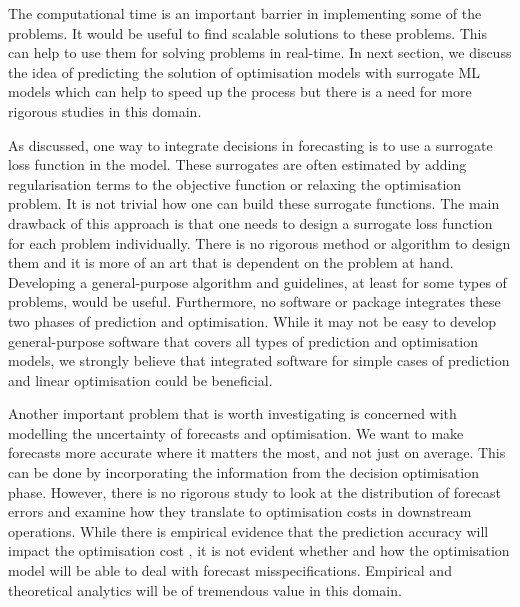 \documentclass[graybox]{svmult}
\begin{document}
 The computational time is an important barrier in implementing some of the problems. It would be useful to find scalable solutions to these problems. This can help to use them for solving problems in real-time.  In next section, we discuss the idea of predicting the solution of optimisation models with surrogate ML models which can help to speed up the process but there is a need for more rigorous studies in this domain. 

As discussed, one way to integrate decisions in forecasting is to use a  surrogate loss function in the model. These surrogates are often estimated by adding regularisation terms to the objective function or relaxing the optimisation problem. It is not trivial how one can build these surrogate functions. The main drawback of this approach is that one needs to design a surrogate loss function for each problem individually. There is no rigorous method or algorithm to design them and it is more of an art that is dependent on the problem at hand. Developing a general-purpose algorithm and guidelines, at least for some types of problems, would be useful. Furthermore, no software or package integrates these two phases of prediction and optimisation. While it may not be easy to develop general-purpose software that covers all types of prediction and optimisation models, we strongly believe that integrated software for simple cases of prediction and linear optimisation could be beneficial.

Another important problem that is worth investigating is concerned with modelling the uncertainty of forecasts and optimisation. We want to make forecasts more accurate where it matters the most, and not just on average. This can be done by incorporating the information from the decision optimisation phase. However, there is no rigorous study to look at the distribution of forecast errors and examine how they translate to optimisation costs in downstream operations. While there is empirical evidence that the prediction accuracy will impact the optimisation cost \cite{gitmahdi}, it is not evident whether and how the optimisation model will be able to deal with forecast misspecifications. Empirical and theoretical analytics will be of tremendous value in this domain.
\end{document}

